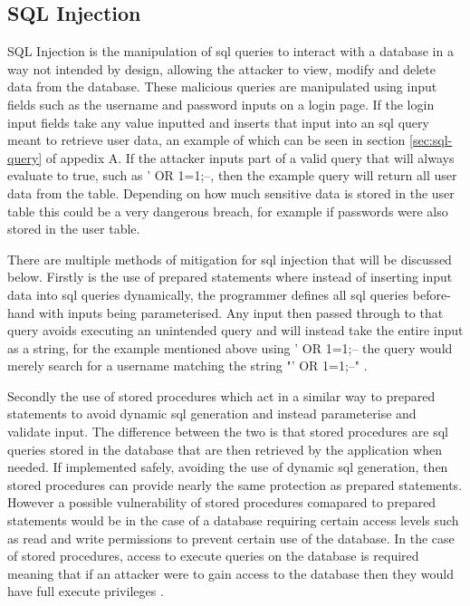 \documentclass{ueacmpstyle}
\begin{document}
      \subsection{SQL Injection}\label{sub:SqlInjection}
      SQL Injection is the manipulation of sql queries to interact with a database in 
      a way not intended by design, allowing the attacker to view, modify and delete 
      data from the database. These malicious queries are manipulated using input 
      fields such as the username and password inputs on a login page. If the login 
      input fields take any value inputted and inserts that input into an sql query 
      meant to retrieve user data, an example of which can be seen in section 
      \ref{sec:sql-query} of appedix A. If the attacker inputs part of a valid query 
      that will always evaluate to true, such as ' OR 1=1;--, then the example query 
      will return all user data from the table. Depending on how much sensitive data 
      is stored in the user table this could be a very dangerous breach, for example 
      if passwords were also stored in the user table.

      There are multiple methods of mitigation for sql injection that will be discussed 
      below. Firstly is the use of prepared statements where instead of inserting input 
      data into sql queries dynamically, the programmer defines all sql queries before-
      hand with inputs being parameterised. Any input then passed through to that query 
      avoids executing an unintended query and will instead take the entire input as a 
      string, for the example mentioned above using ' OR 1=1;-- the query would merely 
      search for a username matching the string "' OR 1=1;--" \citep{OWASPSqlInjectionPrevention}. 

      Secondly the use of stored procedures which act in a similar way to prepared 
      statements to avoid dynamic sql generation and instead parameterise and validate 
      input. The difference between the two is that stored procedures are sql queries 
      stored in the database that are then retrieved by the application when needed. 
      If implemented safely, avoiding the use of dynamic sql generation, then stored 
      procedures can provide nearly the same protection as prepared statements. 
      However a possible vulnerability of stored procedures comapared to prepared 
      statements would be in the case of a database requiring certain access levels 
      such as read and write permissions to prevent certain use of the database. In 
      the case of stored procedures, access to execute queries on the database is 
      required meaning that if an attacker were to gain access to the database then 
      they would have full execute privileges \citep{OWASPSqlInjectionPrevention}.
\end{document}
